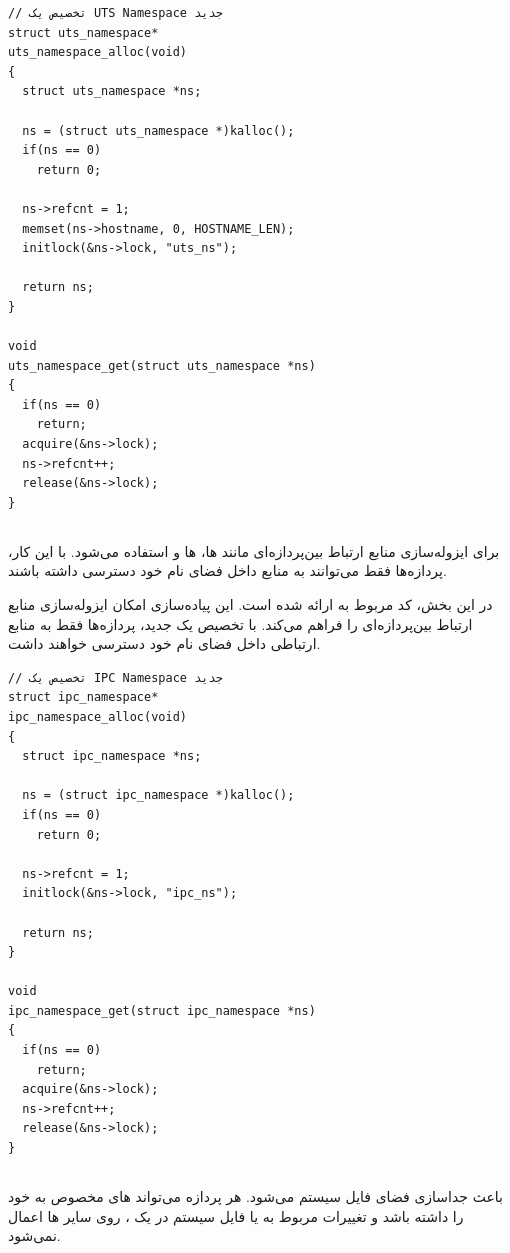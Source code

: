 \documentclass[12pt]{article}
\begin{document}
\begin{LTR}
\begin{lstlisting}
// تخصیص یک UTS Namespace جدید
struct uts_namespace*
uts_namespace_alloc(void)
{
  struct uts_namespace *ns;
  
  ns = (struct uts_namespace *)kalloc();
  if(ns == 0)
    return 0;
  
  ns->refcnt = 1;
  memset(ns->hostname, 0, HOSTNAME_LEN);
  initlock(&ns->lock, "uts_ns");
  
  return ns;
}

void
uts_namespace_get(struct uts_namespace *ns)
{
  if(ns == 0)
    return;
  acquire(&ns->lock);
  ns->refcnt++;
  release(&ns->lock);
}
\end{lstlisting}
\end{LTR}

\subsection{}
 برای ایزوله‌سازی منابع ارتباط بین‌پردازه‌ای مانند ها، ها و  استفاده می‌شود. با این کار، پردازه‌ها فقط می‌توانند به منابع  داخل فضای نام خود دسترسی داشته باشند.

در این بخش، کد مربوط به  ارائه شده است. این پیاده‌سازی
امکان ایزوله‌سازی منابع ارتباط بین‌پردازه‌ای را فراهم می‌کند. با تخصیص یک
 جدید، پردازه‌ها فقط به منابع ارتباطی داخل فضای نام خود
دسترسی خواهند داشت.


\begin{LTR}
\begin{lstlisting}
// تخصیص یک IPC Namespace جدید
struct ipc_namespace*
ipc_namespace_alloc(void)
{
  struct ipc_namespace *ns;
  
  ns = (struct ipc_namespace *)kalloc();
  if(ns == 0)
    return 0;
  
  ns->refcnt = 1;
  initlock(&ns->lock, "ipc_ns");
  
  return ns;
}

void
ipc_namespace_get(struct ipc_namespace *ns)
{
  if(ns == 0)
    return;
  acquire(&ns->lock);
  ns->refcnt++;
  release(&ns->lock);
}
\end{lstlisting}
\end{LTR}

\subsection{}
 باعث جداسازی فضای فایل سیستم می‌شود. هر پردازه می‌تواند های مخصوص به خود را داشته باشد و تغییرات مربوط به  یا  فایل سیستم در یک ، روی سایر ها اعمال نمی‌شود.
\end{document}

